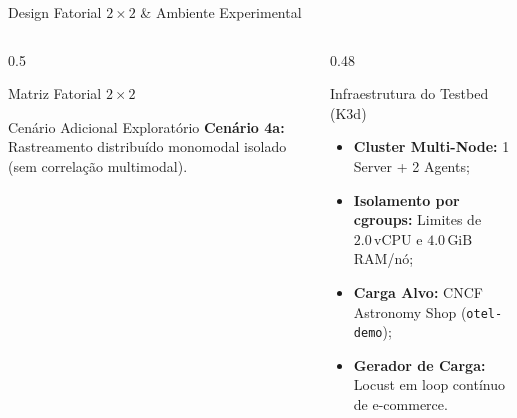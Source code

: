 \documentclass[aspectratio=169, 10pt]{beamer}
\begin{document}
\begin{frame}{Design Fatorial $2 \times 2$ \& Ambiente Experimental}
  \begin{columns}[T]
    \begin{column}{0.5\textwidth}
      \begin{block}{Matriz Fatorial $2 \times 2$}
        \centering
      \end{block}
      \vspace{-0.5ex}
      \begin{exampleblock}{Cenário Adicional Exploratório}
        \small \textbf{Cenário 4a:} Rastreamento distribuído monomodal isolado (sem correlação multimodal).
      \end{exampleblock}
    \end{column}
    
    \begin{column}{0.48\textwidth}
      \begin{alertblock}{Infraestrutura do Testbed (K3d)}
        \small
        \begin{itemize}
          \item \textbf{Cluster Multi-Node:} 1 Server + 2 Agents;
          \item \textbf{Isolamento por cgroups:} Limites de $2.0\,\text{vCPU}$ e $4.0\,\text{GiB}$ RAM/nó;
          \item \textbf{Carga Alvo:} CNCF Astronomy Shop (\texttt{otel-demo});
          \item \textbf{Gerador de Carga:} Locust em loop contínuo de e-commerce.
        \end{itemize}
      \end{alertblock}
    \end{column}
  \end{columns}
\end{frame}
\end{document}
